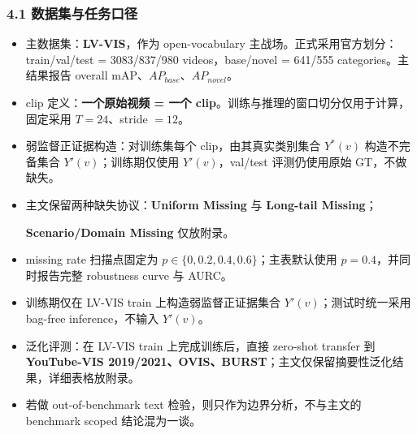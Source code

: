 \documentclass[UTF8]{ctexart}
\begin{document}
\subsubsection*{4.1 数据集与任务口径}
\begin{itemize}
\item 主数据集：\textbf{LV-VIS}，作为 open-vocabulary 主战场。正式采用官方划分：train/val/test = 3083/837/980 videos，base/novel = 641/555 categories。主结果报告 overall mAP、$AP_{base}$、$AP_{novel}$。
\item clip 定义：\textbf{一个原始视频 = 一个 clip}。训练与推理的窗口切分仅用于计算，固定采用 $T=24$、stride $=12$。
\item 弱监督正证据构造：对训练集每个 clip，由其真实类别集合 $Y^*(v)$ 构造不完备集合 $Y'(v)$；训练期仅使用 $Y'(v)$，val/test 评测仍使用原始 GT，不做缺失。
\item 主文保留两种缺失协议：\textbf{Uniform Missing} 与 \textbf{Long-tail Missing}；\par\hspace*{1.6em}\textbf{Scenario/Domain Missing} 仅放附录。
\item missing rate 扫描点固定为 \textbf{$p\in\{0,0.2,0.4,0.6\}$}；主表默认使用 \textbf{$p=0.4$}，并同时报告完整 robustness curve 与 AURC。
\item 训练期仅在 LV-VIS train 上构造弱监督正证据集合 $Y'(v)$；测试时统一采用 bag-free inference，不输入 $Y'(v)$。
\item 泛化评测：在 LV-VIS train 上完成训练后，直接 zero-shot transfer 到 \textbf{YouTube-VIS 2019/2021、OVIS、BURST}；主文仅保留摘要性泛化结果，详细表格放附录。
\item 若做 out-of-benchmark text 检验，则只作为边界分析，不与主文的 benchmark scoped 结论混为一谈。
\end{itemize}
\end{document}
